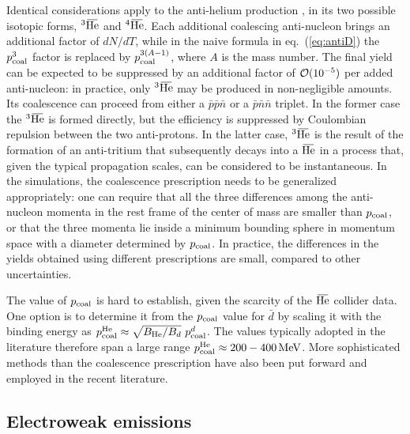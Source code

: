 Identical considerations apply to the anti-helium production \cite{Antihelium}, in its two possible isotopic forms, $^3\overbar{\rm He}$ and $^4\overbar{\rm He}$. 
Each additional coalescing anti-nucleon brings an additional factor of $dN/dT$, while in the naive formula in eq.~(\ref{eq:antiD}) the $p_{\rm coal}^3$ factor is replaced by $p_{\rm coal}^{3(A-1)}$, where $A$ is the mass number. The final yield can be expected to be suppressed by an additional factor of ${\cal O}(10^{-5})$ per added anti-nucleon: in practice, only $^3\overbar{\rm He}$ may be produced in non-negligible amounts. 
Its coalescence can proceed from either a $\bar p \bar p \bar n$ or a $\bar p \bar n \bar n$ triplet. In the former case the $^3\overbar{\rm He}$ is formed directly, but the efficiency is suppressed by Coulombian repulsion between the two anti-protons. In the latter case, $^3\overbar{\rm He}$ is the result of the formation of an anti-tritium that subsequently decays into a $\overbar{\rm He}$ in a process that, given the typical propagation scales, can be considered to be instantaneous. 
In the simulations, the coalescence prescription needs to be generalized appropriately: one can require that all the three differences among the anti-nucleon momenta in the rest frame of the center of mass are smaller than $p_{\rm coal}$, or that the three momenta lie inside a minimum bounding sphere in momentum space with a diameter determined by $p_{\rm coal}$. 
In practice, the differences in the yields obtained using different prescriptions are small, compared to other uncertainties. 

The value of $p_{\rm coal}$ is hard to establish, given the scarcity of the $\overbar{\rm He}$ collider data. One option is to determine it from the $p_{\rm coal}$ value for $\bar d$  by scaling it with the binding energy as $p_{\rm coal}^{\rm He} \approx \sqrt{B_{\rm He}/B_{d}} \ p_{\rm coal}^{d}$. The  values typically adopted in the literature therefore span  a large range $p_{\rm coal}^{\rm He} \approx 200-400\,{\rm MeV}$. 
More sophisticated methods than the coalescence prescription have also been put forward and employed in the recent literature. 





\subsection{Electroweak emissions} 
\label{sec:EWemissions}

